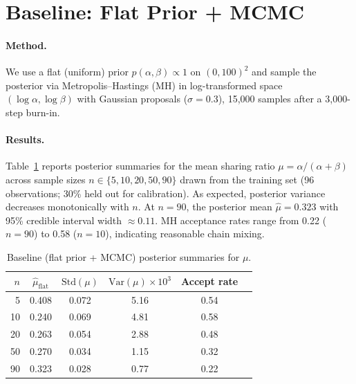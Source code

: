 \documentclass[11pt]{article}
\begin{document}
\section{Baseline: Flat Prior + MCMC}

\paragraph{Method.}
We use a flat (uniform) prior $p(\alpha,\beta) \propto 1$ on $(0, 100)^2$ and sample the posterior via Metropolis--Hastings (MH) in log-transformed space $(\log\alpha, \log\beta)$ with Gaussian proposals ($\sigma = 0.3$), 15{,}000 samples after a 3{,}000-step burn-in.

\paragraph{Results.}
Table~\ref{tab:baseline} reports posterior summaries for the mean sharing ratio $\mu = \alpha/(\alpha+\beta)$ across sample sizes $n \in \{5, 10, 20, 50, 90\}$ drawn from the training set (96 observations; 30\% held out for calibration).
As expected, posterior variance decreases monotonically with $n$.
At $n=90$, the posterior mean $\hat{\mu} = 0.323$ with 95\% credible interval width $\approx 0.11$.
MH acceptance rates range from 0.22 ($n=90$) to 0.58 ($n=10$), indicating reasonable chain mixing.

\begin{table}[h]
  \centering
  \small
  \begin{tabular}{rccccc}
    \toprule
    $n$ & $\hat{\mu}_{\mathrm{flat}}$ & $\mathrm{Std}(\mu)$ & $\mathrm{Var}(\mu) \times 10^3$ & Accept rate \\
    \midrule
    5   & 0.408 & 0.072 & 5.16 & 0.54 \\
    10  & 0.240 & 0.069 & 4.81 & 0.58 \\
    20  & 0.263 & 0.054 & 2.88 & 0.48 \\
    50  & 0.270 & 0.034 & 1.15 & 0.32 \\
    90  & 0.323 & 0.028 & 0.77 & 0.22 \\
    \bottomrule
  \end{tabular}
  \caption{Baseline (flat prior + MCMC) posterior summaries for $\mu$.}
  \label{tab:baseline}
\end{table}

\end{document}
